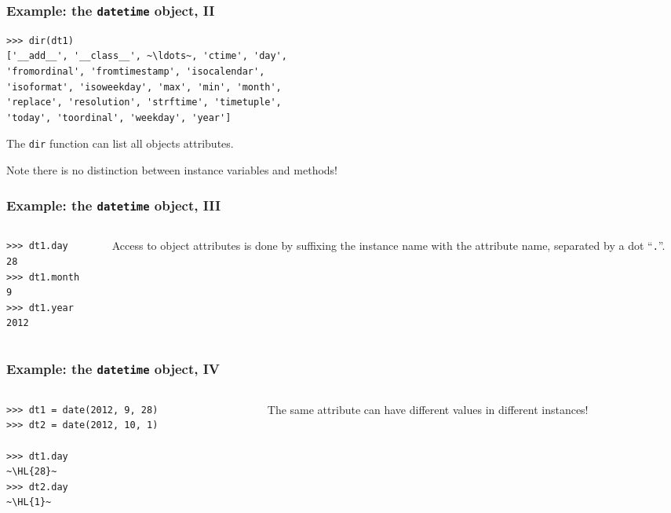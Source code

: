 \documentclass[english,serif,mathserif,xcolor=pdftex,dvipsnames,table]{beamer}
\begin{document}
\begin{frame}[fragile]
  \frametitle{Example: the \texttt{datetime} object, II}
\begin{lstlisting}
>>> dir(dt1)
['__add__', '__class__', ~\ldots~, 'ctime', 'day',
'fromordinal', 'fromtimestamp', 'isocalendar',
'isoformat', 'isoweekday', 'max', 'min', 'month',
'replace', 'resolution', 'strftime', 'timetuple',
'today', 'toordinal', 'weekday', 'year']
\end{lstlisting}

  \+
  The \texttt{dir} function can list all objects attributes.

  \+
  Note there is no distinction between instance variables and
  methods!
\end{frame}


\begin{frame}[fragile]
  \frametitle{Example: the \texttt{datetime} object, III}
  \begin{columns}[c]
    \begin{column}{0.5\textwidth}
\begin{lstlisting}
>>> dt1.day
28
>>> dt1.month
9
>>> dt1.year
2012
\end{lstlisting}
    \end{column}
    \begin{column}{0.5\textwidth}
      \raggedleft
      Access to object attributes is done by suffixing the
      instance name with the attribute name, separated by a dot
      ``\texttt{.}''.
    \end{column}
  \end{columns}
\end{frame}


\begin{frame}[fragile]
  \frametitle{Example: the \texttt{datetime} object, IV}
  \begin{columns}[c]
    \begin{column}[b]{0.5\textwidth}
\begin{lstlisting}
>>> dt1 = date(2012, 9, 28)
>>> dt2 = date(2012, 10, 1)

>>> dt1.day
~\HL{28}~
>>> dt2.day
~\HL{1}~
\end{lstlisting}
    \end{column}
    \begin{column}[b]{0.5\textwidth}
      \raggedleft
      The same attribute can have different
      values in different instances!
    \end{column}
  \end{columns}
\end{frame}
\end{document}
